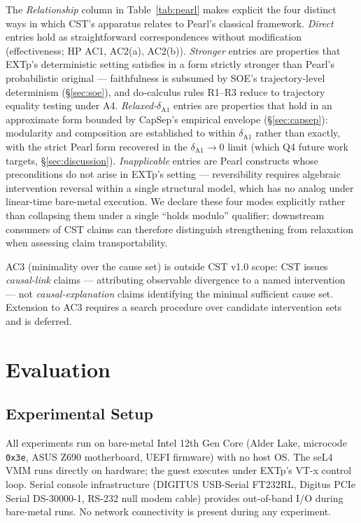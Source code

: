 \documentclass[conference]{IEEEtran}
\begin{document}
The \emph{Relationship} column in Table~\ref{tab:pearl} makes
explicit the four distinct ways in which CST's apparatus relates
to Pearl's classical framework. \emph{Direct} entries hold as
straightforward correspondences without modification
(effectiveness; HP AC1, AC2(a), AC2(b)). \emph{Stronger} entries
are properties that EXTp's deterministic setting satisfies in a
form strictly stronger than Pearl's probabilistic original ---
faithfulness is subsumed by SOE's trajectory-level determinism
(\S\ref{sec:soe}), and do-calculus rules R1--R3 reduce to
trajectory equality testing under A4. \emph{Relaxed-$\delta_{\text{A1}}$}
entries are properties that hold in an approximate form bounded by
CapSep's empirical envelope (\S\ref{sec:capsep}): modularity and
composition are established to within $\delta_{\text{A1}}$ rather
than exactly, with the strict Pearl form recovered in the
$\delta_{\text{A1}} \to 0$ limit (which Q4 future work targets,
\S\ref{sec:discussion}). \emph{Inapplicable} entries are Pearl
constructs whose preconditions do not arise in EXTp's setting ---
reversibility requires algebraic intervention reversal within a
single structural model, which has no analog under linear-time
bare-metal execution. We declare these four modes explicitly
rather than collapsing them under a single ``holds modulo''
qualifier; downstream consumers of CST claims can therefore
distinguish strengthening from relaxation when assessing claim
transportability.

AC3 (minimality over the cause set) is outside CST v1.0 scope: CST
issues \emph{causal-link} claims --- attributing observable
divergence to a named intervention --- not
\emph{causal-explanation} claims identifying the minimal sufficient
cause set. Extension to AC3 requires a search procedure over
candidate intervention sets and is deferred.

\section{Evaluation}\label{sec:eval}

\subsection{Experimental Setup}

All experiments run on bare-metal Intel 12th Gen Core (Alder Lake,
microcode \texttt{0x3e}, ASUS Z690 motherboard, UEFI firmware) with
no host OS. The seL4 VMM runs directly on hardware; the guest
executes under EXTp's VT-x control loop. Serial console infrastructure
(DIGITUS USB-Serial FT232RL, Digitus PCIe Serial DS-30000-1, RS-232
null modem cable) provides out-of-band I/O during bare-metal runs.
No network connectivity is present during any experiment.
\end{document}
